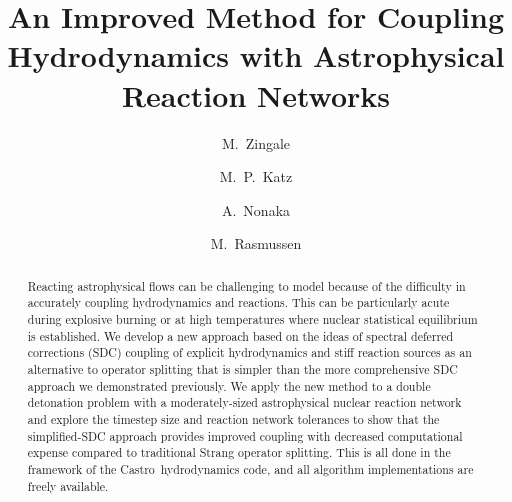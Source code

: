 \documentclass[linenumbers]{aastex631}
\newcommand{\castro}{{\sf Castro}}
\begin{document}
\title{An Improved Method for Coupling Hydrodynamics with Astrophysical Reaction Networks}



\shortauthors{}

\author[0000-0001-8401-030X]{M.~Zingale}

\author[0000-0003-0439-4556]{M.~P.~Katz}

\author[0000-0003-1791-0265]{A.~Nonaka}

\author[0000-0002-0297-0313]{M.~Rasmussen}



\begin{abstract}
Reacting astrophysical flows can be challenging to model because of
the difficulty in accurately coupling hydrodynamics and reactions.
This can be particularly acute during explosive burning or at high
temperatures where nuclear statistical equilibrium is established.  We
develop a new approach based on the ideas of spectral deferred
corrections (SDC) coupling of explicit hydrodynamics and stiff
reaction sources as an alternative to operator splitting that is simpler
than the more
comprehensive SDC approach we demonstrated previously.  We apply the
new method to a double detonation problem with a moderately-sized
astrophysical nuclear reaction network and explore the timestep size
and reaction network tolerances to show that the simplified-SDC
approach provides improved coupling with decreased computational
expense compared to traditional Strang operator
splitting.  This is all done in the framework of the
\castro\ hydrodynamics code, and all algorithm implementations are
freely available.
\end{abstract}
\end{document}
